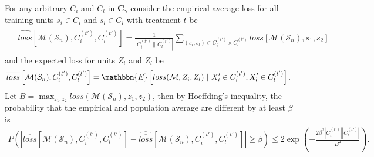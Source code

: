 For any arbitrary $C_i$ and $C_l$ in $\textbf{C}_\gamma$ consider the empirical average loss for all training units $s_i \in C_i$ and $s_l \in C_l$ with treatment $t$ be 
\begin{eqnarray*}
\left.\begin{aligned}
& \widehat{\overline{loss}}\left[\mathcal{M}(\mathcal{S}_n),C^{(t')}_i,C^{(t')}_l\right] = \frac{1}{|C^{(t')}_i\|C^{(t')}_l|}\sum_{(s_i,s_l)\in C^{(t')}_i\times C^{(t')}_l} loss[\mathcal{M}(\mathcal{S}_n),s_1,s_2] & 
\end{aligned}\right.
\end{eqnarray*}
and the expected loss for units $Z_i$ and $Z_l$ be
\begin{eqnarray*}
\left.\begin{aligned}
&
\overline{loss}\left[\mathcal{M}(\mathcal{S}_n),C^{(t')}_i,C^{(t')}_l\right] = \mathbbm{E}\left[loss(\mathcal{M},Z_i,Z_l)~|~X_i^\prime\in C_i^{(t^\prime)}, X_l^\prime\in C_l^{(t^\prime)}\right]. &
\end{aligned}\right.
\end{eqnarray*}
Let $B = \max_{z_1,z_2} loss(\mathcal{M}(\mathcal{S}_n),z_1,z_2)$, then by Hoeffding's inequality, the probability that the empirical and population average are different by at least $\beta$ is 
\begin{eqnarray*}
    P\left(\left| \overline{loss}[\mathcal{M}(\mathcal{S}_n),C^{(t')}_i,C^{(t')}_l] - \widehat{\overline{loss}}[\mathcal{M}(\mathcal{S}_n),C^{(t')}_i,C^{(t')}_l] \right|\geq\beta\right)\leq 2\exp\left(-\frac{2\beta^2|C^{(t')}_i| |C^{(t')}_l|}{B^2}\right).
\end{eqnarray*}

